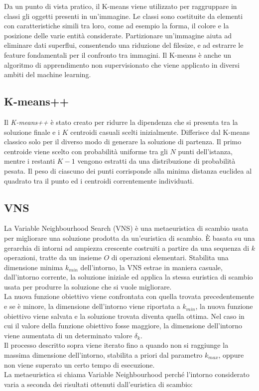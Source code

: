 \documentclass[12pt,a4paper,oneside,hidelinks]{report}
\begin{document}
Da un punto di vista pratico, il K-means viene utilizzato per raggruppare in classi gli oggetti presenti in un'immagine. Le classi sono costituite da elementi con caratteristiche simili tra loro, come ad esempio la forma, il colore e la posizione delle varie entità considerate.
Partizionare un'immagine aiuta ad eliminare dati superflui, consentendo una riduzione del filesize, e ad estrarre le feature fondamentali per il confronto tra immagini.
Il K-means è anche un algoritmo di apprendimento non supervisionato che viene applicato in diversi ambiti del machine learning.

\subsection*{K-means++}
Il \textit{K-means++} è stato creato per ridurre la dipendenza che si presenta tra la soluzione finale e i $K$ centroidi casuali scelti inizialmente. Differisce dal K-means classico solo per il diverso modo di generare la soluzione di partenza.
Il primo centroide viene scelto con probabilità uniforme tra gli $N$ punti dell'istanza, mentre i restanti $K - 1$ vengono estratti da una distribuzione di probabilità pesata. Il peso di ciascuno dei punti corrisponde alla minima distanza euclidea al quadrato tra il punto ed i centroidi correntemente individuati. 

\subsection*{VNS}
La Variable Neighbourhood Search (VNS) è una metaeuristica di scambio usata per migliorare una soluzione prodotta da un'euristica di scambio. È basata su 
una gerarchia di intorni ad ampiezza crescente costruiti a partire da una sequenza di $k$ operazioni, tratte da un insieme $O$ di operazioni elementari.
Stabilita una dimensione minima $k_{min}$ dell'intorno, la VNS estrae in maniera casuale, dall'intorno corrente, la soluzione iniziale ed applica la stessa euristica di scambio usata per produrre la soluzione che si vuole migliorare. \\
La nuova funzione obiettivo viene confrontata con quella trovata precedentemente e se è minore, la dimensione dell'intorno viene riportata a $k_{min}$, la nuova funzione obiettivo viene salvata e la soluzione trovata diventa quella ottima. Nel caso in cui il valore della funzione obiettivo fosse maggiore, la dimensione dell'intorno viene aumentata di un determinato valore $\delta_k$. \\
Il processo descritto sopra viene iterato fino a quando non si raggiunge la massima dimensione dell'intorno, stabilita a priori dal parametro $k_{max}$, oppure non viene superato un certo tempo di esecuzione. \\
La metaeuristica si chiama Variable Neighbourhood perché l'intorno considerato varia a seconda dei risultati ottenuti dall'euristica di scambio:
\end{document}
